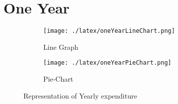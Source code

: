 \documentclass{article}
\begin{document}
\section{One Year}
\begin{figure}[htbp]
\centering
\begin{subfigure}{0.45\textwidth}
\texttt{[image: ./latex/oneYearLineChart.png]}
\caption{Line Graph}
\end{subfigure}
\hfill
\begin{subfigure}{0.45\textwidth}
\texttt{[image: ./latex/oneYearPieChart.png]}
\caption{Pie-Chart}
\end{subfigure}
\caption{Representation of Yearly expenditure}
\end{figure}
\end{document}
